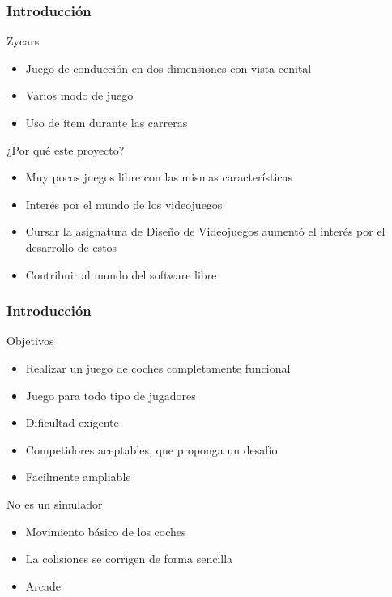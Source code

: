 \begin{frame}
    \frametitle{Introducción}

    \begin{block}{Zycars}
        \begin{itemize}
            \item Juego de conducción en dos dimensiones con vista cenital
            \item Varios modo de juego
            \item Uso de ítem durante las carreras
        \end{itemize}
    \end{block}

    \begin{block}{¿Por qué este proyecto?}
        \begin{itemize}
            \item Muy pocos juegos libre con las mismas características
            \item Interés por el mundo de los videojuegos
            \item Cursar la asignatura de Diseño de Videojuegos aumentó el interés por el desarrollo de estos
            \item Contribuir al mundo del software libre
        \end{itemize}
    \end{block}

\end{frame}

\begin{frame}
    \frametitle{Introducción}

    \begin{block}{Objetivos}
        \begin{itemize}
            \item Realizar un juego de coches completamente funcional
            \item Juego para todo tipo de jugadores
            \item Dificultad exigente
            \item Competidores aceptables, que proponga un desafío
            \item Facilmente ampliable
        \end{itemize}
    \end{block}

    \begin{alertblock}{No es un simulador}
        \begin{itemize}
            \item Movimiento básico de los coches
            \item La colisiones se corrigen de forma sencilla
            \item Arcade
        \end{itemize}
    \end{alertblock}

\end{frame}

